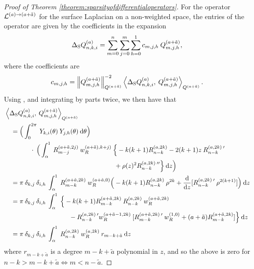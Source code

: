 \documentclass[11pt, oneside]{article}   	%
\begin{document}
\begin{proof}[Proof of Theorem \ref{theorem:sparsityofdifferentialoperators}]
For the operator $\mathcal{L}^{(a)\to(a+\tilde a)}$ for the surface Laplacian on a non-weighted space, the entries of the operator are given by the coefficients in the expansion 
$$\Delta_{\rm S} Q_{n,k,i}^{(a)} = \sum_{m=0}^{n} \sum_{j=0}^m \sum_{h=0}^1 c_{m,j,h} \: Q_{m,j,h}^{(a + \tilde a)},$$
 where the coefficients are
\begin{align*}
	c_{m,j,h} = \norm{\scopmjh^{(a + \tilde a)}}^{-2}_{\scop^{(a + \tilde a)}} \ip<\DeltaS \scopnki^{(a)}, \: \scopmjh^{(a + \tilde a)}>_{\scop^{(a + \tilde a)}}.
\end{align*}
Using , and integrating by parts twice, we then have that
\begin{align*}
	&\ip<\DeltaS \scopnki^{(a)}, \: \scopmjh^{(a + \tilde a)}>_{\scop^{(a + \tilde a)}} \\
	&\quad = \Big( \int_0^{2\pi} \: \chki(\theta) \: \chjh(\theta) \: \D \theta \Big) \\
	&\quad \quad \quad \quad \cdot \: \Big( \int_\alpha^1 \: \genjacmmj^{(a + \tilde a, 2j)} \: \genjacw^{(a + \tilde a), k+j)} \: \Big\{-k(k+1) \genjacnmk^{(a,2k)} - 2(k+1) z \: \genjacnmk^{(a,2k) \: \prime} \\
	&\quad \quad \quad \quad \quad \quad \quad \quad \quad \quad \quad \quad \quad \quad \quad \quad \quad + \rho(z)^2 \genjacnmk^{(a,2k) \: \prime \prime} \Big\} \: \D z \Big) \\
	&\quad = \pi \: \delta_{k,j} \: \delta_{i,h} \: \int_\alpha^1 \: \genjac_{m-k}^{(a+\tilde a,2k)} \: \genjacw^{(a+\tilde a, 0)} \Big( -k(k+1) \genjacnmk^{(a,2k)} \: \rho^{2k} + \ddx{z} [\genjacnmk^{(a,2k) \: \prime} \: \rho^{2(k+1)}] \Big) \: \D z \\
	&\quad = \pi \: \delta_{k,j} \: \delta_{i,h} \: \int_\alpha^1 \: \Big\{ -k(k+1) \genjac_{m-k}^{(a+\tilde a,2k)} \: \genjacnmk^{(a,2k)} \: \genjacw^{(a+\tilde a, 2k)} \\
	&\quad \quad \quad \quad \quad \quad \quad \quad \quad \quad - \genjacnmk^{(a,2k) \: \prime} \genjacw^{(a+\tilde a-1, 2k)} \: [\genjac_{m-k}^{(a+\tilde a,2k) \: \prime} \: \genjacw^{(1,0)} + (a + \tilde a) \genjac_{m-k}^{(a+\tilde a,2k)}] \Big\} \: \D z \\
	&\quad = \pi \: \delta_{k,j} \: \delta_{i,h} \: \int_\alpha^1 \: \genjacnmk^{(a,2k)} \: \genjacw^{(a, 2k)} \: r_{m-k+\tilde a} \: \D z
\end{align*}
where $r_{m-k+\tilde a}$ is a degree $m - k + \tilde a$ polynomial in $z$, and so the above is zero for $n  - k > m - k + \tilde a \iff m < n - \tilde a$.


\end{proof}
\end{document}
